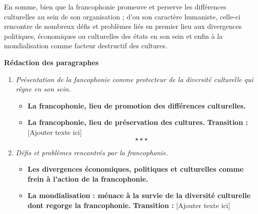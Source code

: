 En somme, bien que la francophonie promeuve et perserve les différences culturelles au sein de son organisation ; d'ou son caractère humaniste, celle-ci rencontre de nombreux défis et problèmes liés en premier lieu aux divergences politiques, économiques ou culturelles des états en son sein et enfin à la mondialisation comme facteur destructif des cultures.

%
%
%
\newpage 
\begin{center}
	{\bfseries Rédaction des paragraphes}	
\end{center}
\begin{enumerate}[label*=$\longrightarrow$]
	\item \textit{Présentation de la fancophonie comme protecteur de la diversité culturelle qui règne en son sein.}
	\begin{itemize}
		\item \textbf{La francophonie, lieu de promotion des différences culturelles.}
		\item \textbf{La francophonie, lieu de préservation des cultures.} \newline \textbf{Transition :} [Ajouter texte ici] $$\star \star \star$$
	\end{itemize}
	\item \textit{Défis et problèmes rencontrés par la francophonie.}
	\begin{itemize}
		\item \textbf{Les divergences économiques, politiques et culturelles comme frein à l'action de la francophonie.}
		\item \textbf{La mondialisation : ménace à la survie de la diversité culturelle dont regorge la francophonie.} \newline \textbf{Transition :} [Ajouter texte ici]
	\end{itemize}
\end{enumerate}
%
